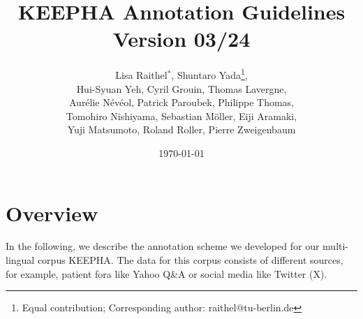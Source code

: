 \documentclass[12pt]{article}
\title{KEEPHA Annotation Guidelines\\ Version 03/24}
\author{Lisa Raithel$^{\ast}$, Shuntaro Yada\thanks{Equal contribution; Corresponding author: raithel@tu-berlin.de},\\
      Hui-Syuan Yeh, Cyril Grouin, Thomas Lavergne,\\
      Aurélie Névéol, Patrick Paroubek, Philippe Thomas,\\
      Tomohiro Nishiyama, Sebastian Möller, Eiji Aramaki,\\
      Yuji Matsumoto, Roland Roller, Pierre Zweigenbaum}
\date{\today}
\theoremstyle{definition}
\begin{document}
\maketitle

\setcounter{tocdepth}{2}
\tableofcontents

\clearpage

\section{Overview}
In the following, we describe the annotation scheme we developed for our multi-lingual corpus KEEPHA.
The data for this corpus consists of different sources, for example, patient fora like Yahoo Q\&A or social media like Twitter (X).



\end{document}
